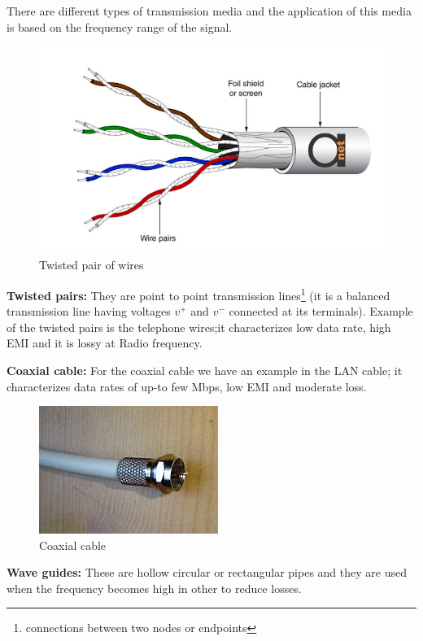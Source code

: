 There are different types of transmission media and the application of this media is based on the frequency range of the signal. \begin{figure}[h]
\centering
\includegraphics[width=1\linewidth]{./graphics/twistedpairs}
\caption{Twisted pair of wires}
\end{figure} 

\textbf{Twisted pairs:} They are point to point transmission lines\footnote{connections between two nodes or endpoints} (it is a balanced transmission line having voltages $v^{+}$ and $v^{-}$ connected at its terminals). Example of the twisted pairs is the telephone wires;it characterizes low data rate, high EMI and it is lossy at Radio frequency.

\textbf{Coaxial cable:} For the coaxial cable we have an example in the LAN cable; it characterizes data rates of up-to few Mbps, low EMI and moderate loss.
\begin{figure}[h]
\centering
\includegraphics[scale=0.4]{./graphics/coaxialcable}
\caption{Coaxial cable}
\end{figure}

\textbf{Wave guides:} These are hollow circular or rectangular pipes and they are used when the frequency becomes high in other to reduce losses. 

